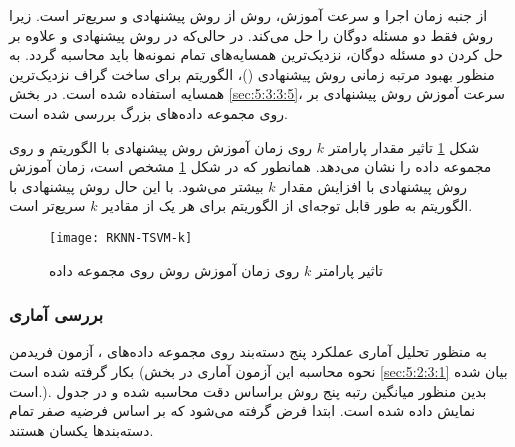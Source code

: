از جنبه زمان اجرا و سرعت آموزش، روش  از روش پیشنهادی و  سریع‌تر است. زیرا روش فقط دو مسئله دوگان را حل می‌کند. در حالی‌که در روش پیشنهادی و  علاوه بر حل کردن دو مسئله دوگان، نزدیک‌ترین همسایه‌های تمام نمونه‌ها باید محاسبه گردد. به منظور بهبود مرتبه زمانی روش پیشنهادی ()، الگوریتم  برای ساخت گراف نزدیک‌ترین همسایه استفاده شده است. در بخش \ref{sec:5:3:3:5}، سرعت آموزش روش پیشنهادی بر روی مجموعه داده‌های بزرگ بررسی شده است.

شکل \ref{fig:RKNN-TSVM-k} تاثیر مقدار پارامتر $k$ روی زمان آموزش روش پیشنهادی با الگوریتم  و  روی مجموعه داده  را نشان می‌دهد. همانطور که در شکل \ref{fig:RKNN-TSVM-k} مشخص است، زمان آموزش روش پیشنهادی با افزایش مقدار $k$ بیشتر می‌شود. با این حال روش پیشنهادی با الگوریتم  به طور قابل توجه‌ای از الگوریتم  برای هر یک از مقادیر $k$ سریع‌تر است.

\begin{figure}[!t]
	\centering
	\texttt{[image: RKNN-TSVM-k]}
	\caption{تاثیر پارامتر $k$ روی زمان آموزش روش  روی مجموعه داده  }
	\label{fig:RKNN-TSVM-k}
\end{figure}

\subsubsection{بررسی آماری}\label{sec:5:3:3:3}
به منظور تحلیل آماری عملکرد پنج دسته‌بند روی مجموعه داده‌های ، آزمون فریدمن بکار گرفته شده است (نحوه محاسبه این آزمون آماری در بخش \ref{sec:5:2:3:1} بیان شده است.). بدین منظور میانگین رتبه پنج روش براساس دقت محاسبه شده و در جدول نمایش داده شده است. ابتدا فرض گرفته می‌شود که بر اساس فرضیه صفر تمام دسته‌بندها یکسان هستند.

